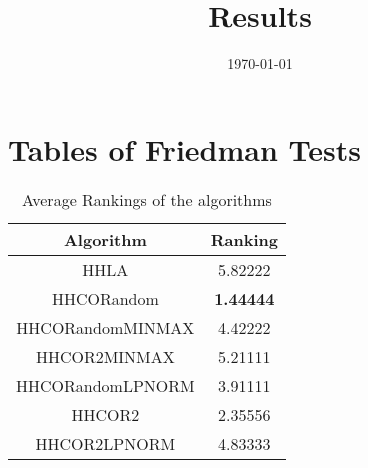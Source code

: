 \documentclass{article}
\title{Results}
\author{}
\date{\today}
\begin{document}
\oddsidemargin 0in \topmargin 0in\maketitle
\section{Tables of Friedman Tests}
\begin{table}[!htp]
\centering
\caption{Average Rankings of the algorithms
}\begin{tabular}{|c|c|}
\hline
Algorithm&Ranking\\
\hline
HHLA&5.82222\\\hline
HHCORandom& {\bf 1.44444}\\\hline
HHCORandomMINMAX&4.42222\\\hline
HHCOR2MINMAX&5.21111\\\hline
HHCORandomLPNORM&3.91111\\\hline
HHCOR2&2.35556\\\hline
HHCOR2LPNORM&4.83333\\\hline
\end{tabular}
\end{table}
\end{document}
